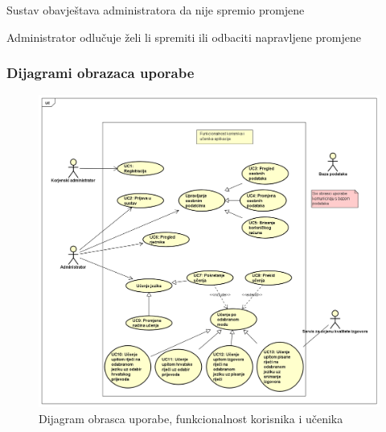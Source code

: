 \begin{packed_item}
\begin{packed_item}
\begin{packed_enum}
								\item Sustav obavještava administratora da nije spremio promjene
								\item Administrator odlučuje želi li spremiti ili odbaciti napravljene promjene
								
							\end{packed_enum}

						\end{packed_item}			
					\end{packed_item}
				
					
				\subsubsection{Dijagrami obrazaca uporabe}
					
					\begin{figure}[H]
						\includegraphics[width=\textwidth]{dijagrami/ucdiag1.png} %
						\caption{Dijagram obrasca uporabe, funkcionalnost korisnika i učenika}
						\label{fig:ucdiag1} %
					\end{figure}

